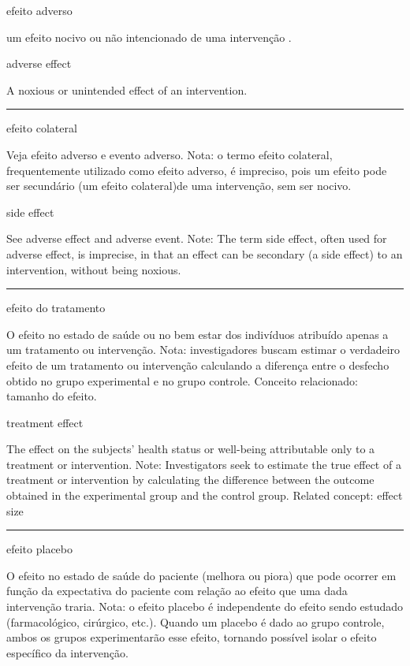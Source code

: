 \documentclass[
]{book}
\begin{document}
efeito adverso

um efeito nocivo ou não intencionado de uma intervenção .

adverse effect

A noxious or unintended effect of an intervention.

\begin{center}\rule{0.5\linewidth}{0.5pt}\end{center}

efeito colateral

Veja efeito adverso e evento adverso. Nota: o termo efeito colateral, frequentemente utilizado como efeito adverso, é impreciso, pois um efeito pode ser secundário (um efeito colateral)de uma intervenção, sem ser nocivo.

side effect

See adverse effect and adverse event. Note: The term side effect, often used for adverse effect, is imprecise, in that an effect can be secondary (a side effect) to an intervention, without being noxious.

\begin{center}\rule{0.5\linewidth}{0.5pt}\end{center}

efeito do tratamento

O efeito no estado de saúde ou no bem estar dos indivíduos atribuído apenas a um tratamento ou intervenção. Nota: investigadores buscam estimar o verdadeiro efeito de um tratamento ou intervenção calculando a diferença entre o desfecho obtido no grupo experimental e no grupo controle. Conceito relacionado: tamanho do efeito.

treatment effect

The effect on the subjects' health status or well-being attributable only to a treatment or intervention. Note: Investigators seek to estimate the true effect of a treatment or intervention by calculating the difference between the outcome obtained in the experimental group and the control group.
Related concept: effect size

\begin{center}\rule{0.5\linewidth}{0.5pt}\end{center}

efeito placebo

O efeito no estado de saúde do paciente (melhora ou piora) que pode ocorrer em função da expectativa do paciente com relação ao efeito que uma dada intervenção traria. Nota: o efeito placebo é independente do efeito sendo estudado (farmacológico, cirúrgico, etc.). Quando um placebo é dado ao grupo controle, ambos os grupos experimentarão esse efeito, tornando possível isolar o efeito específico da intervenção.
\end{document}
